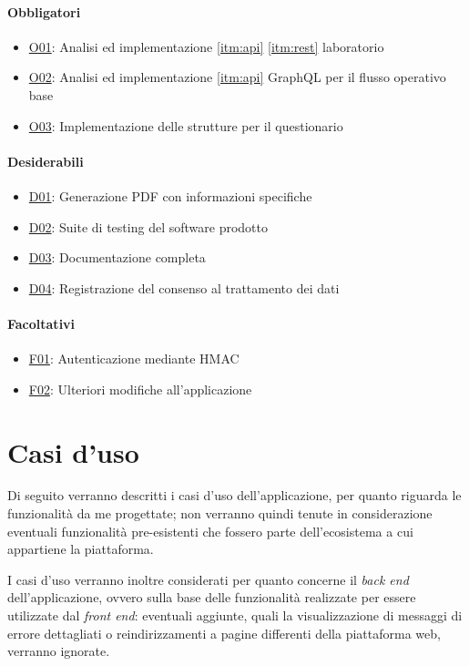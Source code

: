 \paragraph{Obbligatori}
\begin{itemize}
    \item \underline{O01}: Analisi ed implementazione \ref{itm:api} \ref{itm:rest} laboratorio
    \item \underline{O02}: Analisi ed implementazione \ref{itm:api} GraphQL per il flusso operativo base
    \item \underline{O03}: Implementazione delle strutture per il questionario
\end{itemize}
\vspace{-15pt}
\paragraph{Desiderabili}
\begin{itemize}
    \item \underline{D01}: Generazione PDF con informazioni specifiche
    \item \underline{D02}: Suite di testing del software prodotto
    \item \underline{D03}: Documentazione completa
    \item \underline{D04}: Registrazione del consenso al trattamento dei dati
\end{itemize}
\vspace{-15pt}
\paragraph{Facoltativi}
\begin{itemize}
    \item \underline{F01}: Autenticazione mediante HMAC
    \item \underline{F02}: Ulteriori modifiche all’applicazione
\end{itemize}
\section{Casi d'uso}
Di seguito verranno descritti i casi d'uso dell'applicazione, per quanto riguarda le funzionalità da me progettate; non verranno quindi tenute in considerazione eventuali funzionalità pre-esistenti che fossero parte dell'ecosistema a cui appartiene la piattaforma.

I casi d'uso verranno inoltre considerati per quanto concerne il \textit{back end} dell'applicazione, ovvero sulla base delle funzionalità realizzate per essere utilizzate dal \textit{front end}: eventuali aggiunte, quali la visualizzazione di messaggi di errore dettagliati o reindirizzamenti a pagine differenti della piattaforma web, verranno ignorate.

